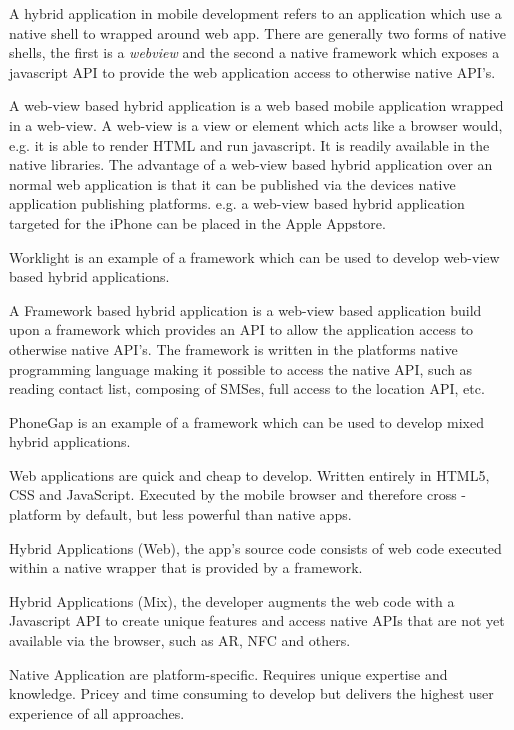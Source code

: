 
A hybrid application in mobile development refers to an application which use a native shell to wrapped around web app. There are generally two forms of native shells, the first is a \emph{webview} and the second a native framework which exposes a javascript API to provide the web application access to otherwise native API's.

A web-view based hybrid application is a web based mobile application wrapped in a web-view. A web-view is a view or element which acts like a browser would, e.g. it is able to render HTML and run javascript.  It is readily available in the native libraries. The advantage of a web-view based hybrid application over an normal web application is that it can be published via the devices native application publishing platforms. e.g. a web-view based hybrid application targeted for the iPhone can be placed in the Apple Appstore. 

Worklight is an example of a framework which can be used to develop web-view based hybrid applications.

A Framework based hybrid application is a web-view based application build upon a framework which provides an API to allow the application access to otherwise native API's. The framework is written in the platforms native programming language making it possible to access the native API, such as reading contact list, composing of SMSes, full access to the location API, etc.

PhoneGap is an example of a framework which can be used to develop mixed hybrid applications.

Web applications are quick and cheap to develop. Written entirely in HTML5, CSS and JavaScript. Executed by the mobile
browser and therefore cross - platform by default, but less powerful than native apps.
 
Hybrid Applications (Web), the app's source code consists of web code executed within a native wrapper that is provided by a framework.
 
Hybrid Applications (Mix), the developer augments the web code with a Javascript API to create unique features and
access native APIs that are not yet available via the browser, such as AR, NFC and others.
 
Native Application are platform-specific. Requires unique expertise and knowledge. Pricey and time consuming to develop but
 delivers the highest user experience of all approaches.

